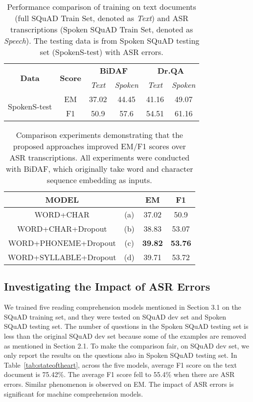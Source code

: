 \documentclass[a4paper]{article}
\begin{document}
\begin{table}[]
\centering
\caption{ Performance comparison of training on  text documents (full SQuAD Train Set, denoted as \textit{Text}) and ASR transcriptions (Spoken SQuAD Train Set,  denoted as \textit{Speech}). The testing data is from Spoken SQuAD testing set (SpokenS-test) with ASR errors.} 
\label{tab:bidaf&drqa}
\begin{tabular}{|c|c|c|c|c|c|}
\hline
\multicolumn{1}{|c|}{\multirow{2}{*}{\textbf{Data}}} &
\multicolumn{1}{|c|}{\multirow{2}{*}{\textbf{Score}}} &
\multicolumn{2}{|c|}{\textbf{BiDAF}} & 
\multicolumn{2}{|c|}{\textbf{Dr.QA}}  \\
\cline{3-4}\cline{5-6}
\multicolumn{1}{|c|}{} & \multicolumn{1}{|c|}{} &  \textit{Text} &  \textit{Spoken} &  \textit{Text} &  \textit{Spoken}   \\
\hline
\hline
\multicolumn{1}{|c|}{\multirow{2}{*}{SpokenS-test}} & EM & 37.02 & 44.45 & 41.16 & 49.07   \\
\multicolumn{1}{|c|}{} & F1 & 50.9 & 57.6 & 54.51 & 61.16  \\
\hline
\end{tabular}
\end{table}

\begin{table}[]
\centering
\caption{Comparison experiments demonstrating that the proposed  approaches improved EM/F1 scores over ASR transcriptions. 
All experiments were conducted with BiDAF, which originally take word and character sequence embedding as inputs.}
\label{tab:bidaf_improve}
\begin{tabular}{|c|c|c|c|}
\hline
\multicolumn{1}{|c|}{{\textbf{MODEL}}} & \multicolumn{1}{|c|}{} &\textbf{EM} & \textbf{F1}  \\
\hline
\hline
WORD+CHAR & (a)  & 37.02 & 50.9 \\
WORD+CHAR+Dropout & (b) & 38.83 & 53.07 \\
WORD+PHONEME+Dropout& (c)    & \textbf{39.82} & \textbf{53.76} \\
WORD+SYLLABLE+Dropout & (d) & 39.71 & 53.72 \\
\hline
\end{tabular}
\end{table}

\subsection{Investigating the Impact of ASR Errors}
We trained five reading comprehension models mentioned in Section 3.1 on the SQuAD training set, and they were tested on SQuAD dev set and Spoken SQuAD testing set. 
The number of questions in the Spoken SQuAD testing set is less than the original SQuAD dev set because some of the examples are removed as mentioned in Section 2.1.
To make the comparison fair, on SQuAD dev set, we only report the results on the questions also in Spoken SQuAD testing set.
In Table~\ref{tab:stateoftheart}, across the five models, average F1 score on the text document is 75.42\%.
The average F1 score fell to 55.4\%  when there are ASR errors. 
Similar phenomenon is observed on EM.
The impact of ASR errors is significant for machine comprehension models. 
\end{document}
